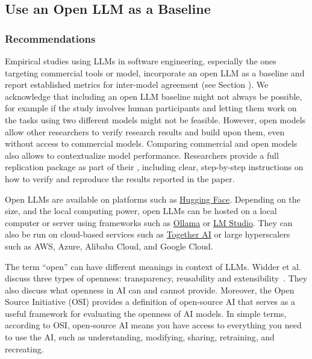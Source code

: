 



\subsection{Use an Open LLM as a Baseline}

\subsubsection{Recommendations}

Empirical studies using LLMs in software engineering, especially the ones targeting commercial tools or model, \should incorporate an open LLM as a baseline and report established metrics for inter-model agreement (see Section \benchmarksmetrics).
We acknowledge that including an open LLM baseline might not always be possible, for example if the study involves human participants and letting them work on the tasks using two different models might not be feasible.
However, open models allow other researchers to verify research results and build upon them, even without access to commercial models.
Comparing commercial and open models also allows to contextualize model performance.
Researchers \should provide a full replication package as part of their \supplementarymaterial, including clear, step-by-step instructions on how to verify and reproduce the results reported in the paper.

Open LLMs are available on platforms such as \href{https://huggingface.co/}{Hugging Face}.
Depending on the size, and the local computing power, open LLMs can be hosted on a local computer or server using frameworks such as \href{https://ollama.com/}{Ollama} or \href{https://lmstudio.ai/}{LM Studio}.
They can also be run on cloud-based services such as \href{https://together.ai/}{Together AI} or large hyperscalers such as AWS, Azure, Alibaba Cloud, and Google Cloud.

The term ``open'' can have different meanings in context of LLMs.
Widder et al. discuss three types of openness: transparency, reusability and extensibility~\cite{widder2024open}.
They also discuss what openness in AI can and cannot provide.
Moreover, the Open Source Initiative (OSI) \cite{OSIAI2024} provides a definition of open-source AI that serves as a useful framework for evaluating the openness of AI models.
In simple terms, according to OSI, open-source AI means  you have access to everything you need to use the AI, such as understanding, modifying, sharing, retraining, and recreating.


